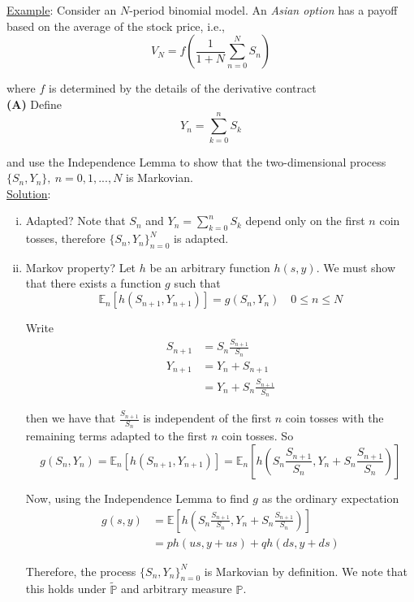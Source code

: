 \documentclass[12pt]{article}
\renewcommand{\P}{\mathbb P}
\newcommand{\E}{\mathbb E}
\begin{document}
\underline{Example}: Consider an $N$-period binomial model. An {\em Asian option} has a payoff based on the average of the stock price, i.e.,
\begin{equation*}
	V_N = f \left( \frac{1}{1 + N} \sum^N_{n = 0} S_n \right)
\end{equation*}

where $f$ is determined by the details of the derivative contract \\

{\bf (A)} Define
\begin{equation*}
	Y_n = \sum^n_{k = 0} S_k
\end{equation*}

and use the Independence Lemma to show that the two-dimensional process $\{S_n, Y_n\},~n=0,1,..., N$ is Markovian. \\

\underline{Solution}:
\begin{enumerate}[(i)]
	\item Adapted? Note that $S_n$ and $Y_n = \sum^n_{k = 0} S_k$ depend only on the first $n$ coin tosses, therefore $\{S_n, Y_n\}^N_{n = 0}$ is adapted. 
	\item Markov property? Let $h$ be an arbitrary function $h(s, y)$. We must show that there exists a function $g$ such that
	\begin{equation*}
		\E_n[h(S_{n + 1}, Y_{n + 1})] = g(S_n, Y_n) \quad 0 \leq n \leq N
	\end{equation*}
	
	Write
	\begin{align*}
		S_{n + 1} &= S_n\frac{S_{n + 1}}{S_n} \\
		Y_{n + 1} &= Y_n + S_{n + 1} \\
		&= Y_n + S_n\frac{S_{n + 1}}{S_n}
	\end{align*}
	
	then we have that $\frac{S_{n + 1}}{S_n}$ is independent of the first $n$ coin tosses with the remaining terms adapted to the first $n$ coin tosses. So
	\begin{equation*}
		g(S_n, Y_n) = \E_n[h(S_{n + 1}, Y_{n + 1})] = \E_n \left[ h \left( S_n \frac{S_{n + 1}}{S_n}, Y_n + S_n\frac{S_{n + 1}}{S_n} \right) \right]
	\end{equation*}
	
	Now, using the Independence Lemma to find $g$ as the ordinary expectation
	\begin{align*}
		g(s,y) &= \E \left[ h \left( S_n \frac{S_{n + 1}}{S_n}, Y_n + S_n\frac{S_{n + 1}}{S_n} \right) \right] \\
		&= ph(us, y + us) + qh(ds, y + ds)
	\end{align*}
	
	Therefore, the process $\{S_n, Y_n\}^N_{n = 0}$ is Markovian by definition. We note that this holds under $\tilde{\P}$ and arbitrary measure $\P$.
\end{enumerate}
\end{document}
